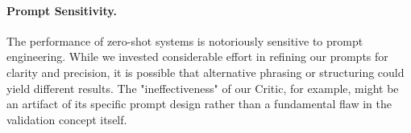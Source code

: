 \paragraph{Prompt Sensitivity.}
The performance of zero-shot systems is notoriously sensitive to prompt engineering. While we invested considerable effort in refining our prompts for clarity and precision, it is possible that alternative phrasing or structuring could yield different results. The "ineffectiveness" of our Critic, for example, might be an artifact of its specific prompt design rather than a fundamental flaw in the validation concept itself.